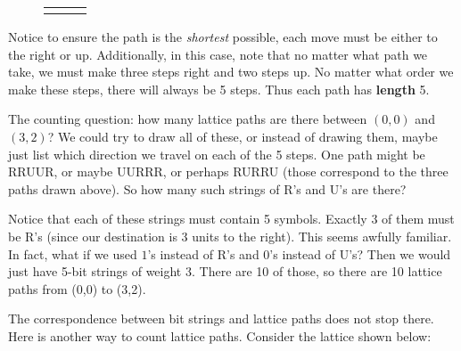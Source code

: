 \documentclass[10pt,]{book}
\newcommand{\terminology}[1]{\textbf{#1}}
\theoremstyle{plain}
\theoremstyle{definition}
\theoremstyle{definition}
\theoremstyle{definition}
\numberwithin{equation}{chapter}
\newlength{\panelmax}
\begin{document}
{\setlength{\tabcolsep}{0.0166666666666667\textwidth}
\begin{figure}
\hspace*{0.0166666666666667\textwidth}%
\begin{tabular}{@{}*{3}{c}@{}}
\begin{minipage}[c][\panelmax][t]{0.3\textwidth}\usebox{\panelboxAGimage}\end{minipage}&
\begin{minipage}[c][\panelmax][t]{0.3\textwidth}\usebox{\panelboxAHimage}\end{minipage}&
\begin{minipage}[c][\panelmax][t]{0.3\textwidth}\usebox{\panelboxAIimage}\end{minipage}\end{tabular}
\end{figure}
}%
\par

        Notice to ensure the path is the \emph{shortest} possible, each move must be either to the right or up. Additionally, in this case, note that no matter what path we take, we must make three steps right and two steps up. No matter what order we make these steps, there will always be 5 steps. Thus each path has \terminology{length} 5.
\par

        The counting question: how many lattice paths are there between \((0,0)\) and \((3,2)\)? We could try to draw all of these, or instead of drawing them, maybe just list which direction we travel on each of the 5 steps. One path might be RRUUR, or maybe UURRR, or perhaps RURRU (those correspond to the three paths drawn above). So how many such strings of R's and U's are there?
\par

        Notice that each of these strings must contain 5 symbols. Exactly 3 of them must be R's (since our destination is 3 units to the right). This seems awfully familiar. In fact, what if we used \(1\)'s instead of R's and 0's instead of U's? Then we would just have 5-bit strings of weight 3. There are 10 of those, so there are 10 lattice paths from (0,0) to (3,2).
\par

        The correspondence between bit strings and lattice paths does not stop there. Here is another way to count lattice paths. Consider the lattice shown below:
\leavevmode%
\begin{figure}
\centering
{
}
\end{figure}
\par
\end{document}
